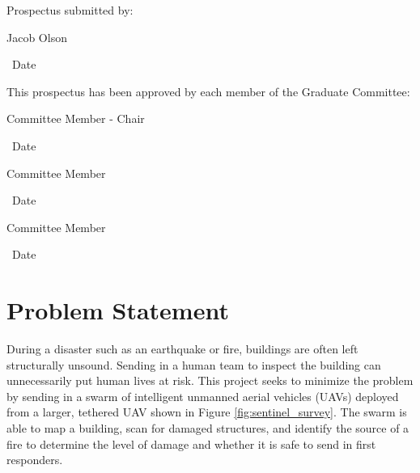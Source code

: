 \documentclass[12pt, letterpaper]{article}
\begin{document}
\hspace*{.47in}
\begin{minipage}[c]{5.25in}

\normalsize

Prospectus submitted by:

\vspace{.5in}

\makebox[2in]{\hrulefill} \hspace{1in} \makebox[2in]{\hrulefill}

\parbox[b]{3in}{Jacob Olson} \, Date
\vspace{0.5in}

This prospectus has been approved by each member of the Graduate Committee:
\vspace{0.5in}

\makebox[2in]{\hrulefill} \hspace{1in} \makebox[2in]{\hrulefill}

\parbox[b]{3in}{Committee Member - Chair} \, Date
\vspace{0.4in}

\makebox[2in]{\hrulefill} \hspace{1in} \makebox[2in]{\hrulefill}

\parbox[b]{3in}{Committee Member} \, Date
\vspace{0.4in}

\makebox[2in]{\hrulefill} \hspace{1in} \makebox[2in]{\hrulefill}

\parbox[b]{3in}{Committee Member} \, Date

\end{minipage}

\vspace*{\fill}

\pagebreak

\setcounter{page}{1}

\section{Problem Statement}
During a disaster such as an earthquake or fire, buildings are often left structurally unsound. Sending in a human team to inspect the building can unnecessarily put human lives at risk. This project seeks to minimize the problem by sending in a swarm of intelligent unmanned aerial vehicles (UAVs) deployed from a larger, tethered UAV shown in Figure \ref{fig:sentinel_survey}. The swarm is able to map a building, scan for damaged structures, and identify the source of a fire to determine the level of damage and whether it is safe to send in first responders.
\end{document}
